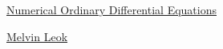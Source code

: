 \documentclass[11pt]{article}
\begin{document}
	\kaishu 
	\setcounter{section}{0}
	\begin{center}
		{\LARGE  \href{https://www.youtube.com/playlist?list=PLHZhjPByiV3Ix0McE7iz8e_kQgxJwaB07}{Numerical Ordinary Differential Equations}}
		
		
		{\large \href{https://mathweb.ucsd.edu/~mleok/}{Melvin Leok}}
	\end{center}
\setcounter{page}{1}



\vspace{-1cm}
\end{document}
